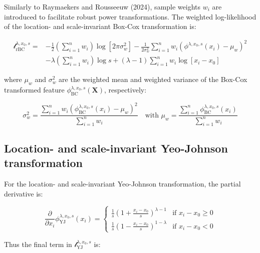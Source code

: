 \documentclass[
  a4paper,
]{article}
\begin{document}
Similarly to Raymaekers and Rousseeuw (2024), sample weights \(w_i\) are
introduced to facilitate robust power transformations. The weighted
log-likelihood of the location- and scale-invariant Box-Cox
transformation is:

\begin{equation}
\begin{split}
\mathcal{l}_{\text{rBC}}^{\lambda, x_0, s} = & -\frac{1}{2} \left(\sum_{i=1}^n w_i \right) \log \left[ 2 \pi \sigma_w^2 \right] -\frac{1}{2 \sigma_w^2} \sum_{i=1}^n w_i \left( \phi^{\lambda, x_0, s}(x_i) - \mu_w \right)^2 \\
& - \lambda \left( \sum_{i=1}^n w_i \right) \log s + \left( \lambda - 1 \right) \sum_{i=1}^n w_i \log \left[ x_i - x_0 \right]
\end{split}
\end{equation}

where \(\mu_w\) and \(\sigma^2_w\) are the weighted mean and weighted
variance of the Box-Cox transformed feature
\(\phi_{\text{BC}}^{\lambda, x_0, s} (\mathbf{X})\), respectively:

\begin{equation}
\sigma_w^2 = \frac{\sum_{i=1}^n w_i \left(\phi_{\text{BC}}^{\lambda, x_0, s} (x_i) - \mu_w \right)^2}{\sum_{i=1}^n w_i} \quad \text{with } \mu_w = \frac{\sum_{i=1}^n \phi_{\text{BC}}^{\lambda, x_0, s} (x_i)} {\sum_{i=1}^n w_i}
\end{equation}

\subsection{Location- and scale-invariant Yeo-Johnson
transformation}\label{location--and-scale-invariant-yeo-johnson-transformation}

For the location- and scale-invariant Yeo-Johnson transformation, the
partial derivative is:

\begin{equation}
\frac{\partial}{\partial x_i} \phi_{\text{YJ}}^{\lambda, x_0, s}(x_i) =
\begin{cases}
\frac{1}{s} \left(1 + \frac{x_i - x_0}{s}\right)^{\lambda - 1} & \text{if } x_i - x_0 \geq 0\\
\frac{1}{s} \left(1 - \frac{x_i - x_0}{s}\right)^{1 - \lambda} & \text{if } x_i - x_0 < 0
\end{cases}
\end{equation}

Thus the final term in \(\mathcal{l}_{\text{YJ}}^{\lambda, x_0, s}\) is:
\end{document}
